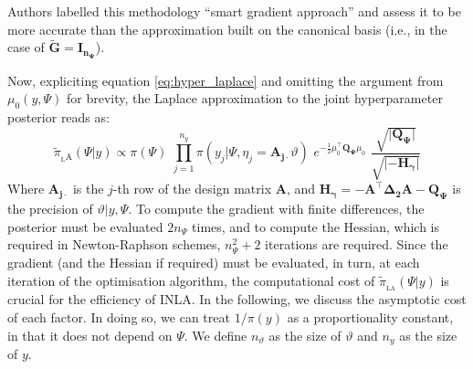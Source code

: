 \documentclass[openany, 11pt, oneside]{book}
\begin{document}
Authors labelled this methodology ``smart gradient approach'' and assess it to be more accurate than the approximation built on the canonical basis (i.e., in the case of $\boldsymbol{\tilde{G}}=\boldsymbol{I_{n_\Psi}}$).

Now, expliciting equation \ref{eq:hyper_laplace} and omitting the argument from $\mu_0(y, \Psi)$ for brevity, the Laplace approximation to the joint hyperparameter posterior reads as:
\begin{equation}
\tilde{\pi}_\mathrm{_LA}\left(\Psi \vert y \right) \propto \pi(\Psi) \,\,
\prod_{j=1}^{n_y} \pi \left( y_j \vert\Psi,  \eta_j = \boldsymbol{A_{j\cdot}} \vartheta\right)  \,\,
e^{-\frac{1}{2} \mu_0 ^\top \boldsymbol{Q_\Psi} \mu_0} \,\,
\frac{\sqrt{\lvert \boldsymbol{Q_\Psi} \rvert}}{\sqrt{\lvert -\boldsymbol{H_\gamma} \rvert}}
\label{eq:hyper_post_explicit}
\end{equation}
Where $\boldsymbol{A_{j\cdot}}$ is the $j$-th row of the design matrix $\boldsymbol{A}$, and $\boldsymbol{H_\gamma} = -\boldsymbol{A}^\top \boldsymbol{\Delta_2 A} - \boldsymbol{Q_\Psi}$ is the precision of $\vartheta \vert y, \Psi$. To compute the gradient with finite differences, the posterior must be evaluated $2n_\Psi$ times, and to compute the Hessian, which is required in Newton-Raphson schemes, $n_\Psi^2  + 2$ iterations are required. Since the gradient (and the Hessian if required) must be evaluated, in turn, at each iteration of the optimisation algorithm, the computational cost of $\tilde{\pi}_\mathrm{_{LA}}(\Psi \vert y)$ is crucial for the efficiency of INLA. In the following, we discuss the asymptotic cost of each factor. In doing so, we can treat $1/\pi(y)$ as a proportionality constant, in that it does not depend on $\Psi$. We define $n_\vartheta$ as the size of $\vartheta$ and $n_y$ as the size of $y$.
\end{document}
